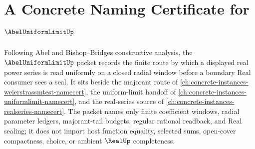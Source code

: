 \chapter{A Concrete Naming Certificate for $\AbelUniformLimitUp$}
\label{ch:concrete-instances-abel-uniform-limit-namecert}

Following Abel and Bishop--Bridges constructive analysis, the $\AbelUniformLimitUp$ packet records the finite route by which a displayed real power series is read uniformly on a closed radial window before a boundary Real consumer sees a seal. It sits beside the majorant route of \autoref{ch:concrete-instances-weierstrassmtest-namecert}, the uniform-limit handoff of \autoref{ch:concrete-instances-uniformlimit-namecert}, and the real-series source of \autoref{ch:concrete-instances-realseries-namecert}. The packet names only finite coefficient windows, radial parameter ledgers, majorant-tail budgets, regular rational readback, and Real sealing; it does not import host function equality, selected sums, open-cover compactness, choice, or ambient $\RealUp$ completeness.

